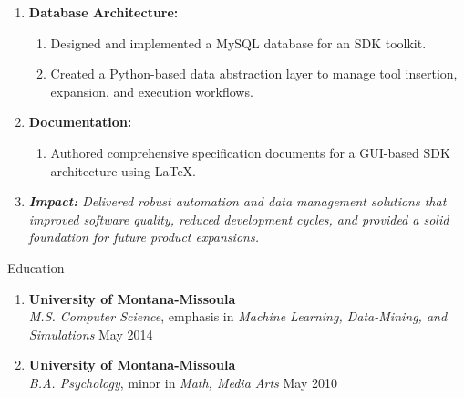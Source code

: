 \documentclass[oneside]{article}%
\begin{document}
\begin{enumerate}[]
\begin{enumerate}[]
			\begin{enumerate}[-]
				\item Created a GUI-based test automation application using Python (GTK).
				\item Wrote architectural specifications in \LaTeX\ to ensure clarity and maintainability.
			\end{enumerate}
		\item \textbf{Database Architecture:}
			\begin{enumerate}[-]
				\item Designed and implemented a MySQL database for an SDK toolkit.
				\item Created a Python-based data abstraction layer to manage tool insertion, expansion, and execution workflows.
			\end{enumerate}
		\item \textbf{Documentation:}
			\begin{enumerate}[-]
				\item Authored comprehensive specification documents for a GUI-based SDK architecture using \LaTeX.
			\end{enumerate}
	\item \textit{\textbf{Impact:} Delivered robust automation and data management solutions that improved software quality, reduced development cycles, 
	and provided a solid foundation for future product expansions.}
	\end{enumerate}
\end{enumerate}
\newpage

\noindent
\huge{Education}
\small
\begin{enumerate}[]
\item \textbf{University of Montana-Missoula}\\
	\textit{M.S. Computer Science}, emphasis in \textit{Machine Learning, Data-Mining, and Simulations} \hfill May 2014
\item \textbf{University of Montana-Missoula}\\
	\textit{B.A. Psychology}, minor in \textit{Math, Media Arts} \hfill May 2010
	\
\end{enumerate}
\
\end{document}

